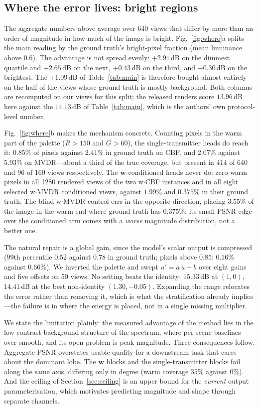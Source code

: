 \documentclass[conference]{IEEEtran}
\begin{document}
\subsection{Where the error lives: bright regions}
\label{sec:where}

The aggregate numbers above average over 640 views that differ by more than an
order of magnitude in how much of the image is bright. Fig.~\ref{fig:where}a
splits the main reading by the ground truth's bright-pixel fraction (mean
luminance above $0.6$). The advantage is not spread evenly: $+2.91$\,dB on the
dimmest quartile and $+2.65$\,dB on the next, $+0.43$\,dB on the third, and
$-0.30$\,dB on the brightest. The $+1.09$\,dB of Table~\ref{tab:main} is
therefore bought almost entirely on the half of the views whose ground truth is
mostly background. Both columns are recomputed on our views for this split; the
released renders score $13.96$\,dB here against the $14.13$\,dB of
Table~\ref{tab:main}, which is the authors' own protocol-level number.

Fig.~\ref{fig:where}b makes the mechanism concrete. Counting pixels in the warm
part of the palette ($R>150$ and $G>60$), the single-transmitter heads do reach
it: $0.85\%$ of pixels against $2.41\%$ in ground truth on CBF, and $2.07\%$
against $5.93\%$ on MVDR---about a third of the true coverage, but present in
414 of 640 and 96 of 160 views respectively. The $\mathbf{w}$-conditioned heads
never do: zero warm pixels in all 1280 rendered views of the two w$\cdot$CBF
instances and in all eight selected w$\cdot$MVDR conditioned views, against
$1.99\%$ and $0.375\%$ in their ground truth. The blind w$\cdot$MVDR control
errs in the opposite direction, placing $3.55\%$ of the image in the warm end
where ground truth has $0.375\%$: its small PSNR edge over the conditioned arm
comes with a \emph{worse} magnitude distribution, not a better one.

The natural repair is a global gain, since the model's scalar output is
compressed ($99$th percentile $0.52$ against $0.78$ in ground truth; pixels
above $0.85$: $0.16\%$ against $0.66\%$). We inverted the palette and swept
$u'=a\,u+b$ over eight gains and five offsets on 50 views. No setting beats the
identity: $15.33$\,dB at $(1,0)$, $14.41$\,dB at the best non-identity
$(1.30,-0.05)$. Expanding the range relocates the error rather than removing
it, which is what the stratification already implies---the failure is in where
the energy is placed, not in a single missing multiplier.

We state the limitation plainly: the measured advantage of the method lies in
the low-contrast background structure of the spectrum, where per-scene
baselines over-smooth, and its open problem is peak magnitude. Three
consequences follow. Aggregate PSNR overstates usable quality for a downstream
task that cares about the dominant lobe. The $\mathbf{w}$ blocks and the
single-transmitter blocks fail along the same axis, differing only in degree
(warm coverage $35\%$ against $0\%$). And the ceiling of
Section~\ref{sec:ceiling} is an upper bound for the \emph{current} output
parameterisation, which motivates predicting magnitude and shape through
separate channels.
\end{document}

